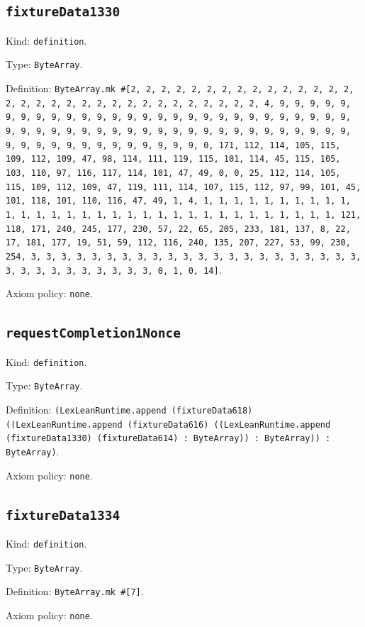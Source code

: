 \documentclass[11pt]{article}
\begin{document}
\subsection*{\texttt{fixtureData1330}}
\noindent Kind: \texttt{definition}.\par
\noindent Type: \texttt{ByteArray}.\par
\noindent Definition: \texttt{ByteArray.mk \#[2, 2, 2, 2, 2, 2, 2, 2, 2, 2, 2, 2, 2, 2, 2, 2, 2, 2, 2, 2, 2, 2, 2, 2, 2, 2, 2, 2, 2, 2, 2, 2, 4, 9, 9, 9, 9, 9, 9, 9, 9, 9, 9, 9, 9, 9, 9, 9, 9, 9, 9, 9, 9, 9, 9, 9, 9, 9, 9, 9, 9, 9, 9, 9, 9, 9, 9, 9, 9, 9, 9, 9, 9, 9, 9, 9, 9, 9, 9, 9, 9, 9, 9, 9, 9, 9, 9, 9, 9, 9, 9, 9, 9, 9, 9, 9, 9, 0, 171, 112, 114, 105, 115, 109, 112, 109, 47, 98, 114, 111, 119, 115, 101, 114, 45, 115, 105, 103, 110, 97, 116, 117, 114, 101, 47, 49, 0, 0, 25, 112, 114, 105, 115, 109, 112, 109, 47, 119, 111, 114, 107, 115, 112, 97, 99, 101, 45, 101, 118, 101, 110, 116, 47, 49, 1, 4, 1, 1, 1, 1, 1, 1, 1, 1, 1, 1, 1, 1, 1, 1, 1, 1, 1, 1, 1, 1, 1, 1, 1, 1, 1, 1, 1, 1, 1, 1, 1, 1, 121, 118, 171, 240, 245, 177, 230, 57, 22, 65, 205, 233, 181, 137, 8, 22, 17, 181, 177, 19, 51, 59, 112, 116, 240, 135, 207, 227, 53, 99, 230, 254, 3, 3, 3, 3, 3, 3, 3, 3, 3, 3, 3, 3, 3, 3, 3, 3, 3, 3, 3, 3, 3, 3, 3, 3, 3, 3, 3, 3, 3, 3, 3, 3, 0, 1, 0, 14]}.\par
\noindent Axiom policy: \texttt{none}.\par
\subsection*{\texttt{requestCompletion1Nonce}}
\noindent Kind: \texttt{definition}.\par
\noindent Type: \texttt{ByteArray}.\par
\noindent Definition: \texttt{(LexLeanRuntime.append (fixtureData618) ((LexLeanRuntime.append (fixtureData616) ((LexLeanRuntime.append (fixtureData1330) (fixtureData614) : ByteArray)) : ByteArray)) : ByteArray)}.\par
\noindent Axiom policy: \texttt{none}.\par
\subsection*{\texttt{fixtureData1334}}
\noindent Kind: \texttt{definition}.\par
\noindent Type: \texttt{ByteArray}.\par
\noindent Definition: \texttt{ByteArray.mk \#[7]}.\par
\noindent Axiom policy: \texttt{none}.\par
\end{document}
